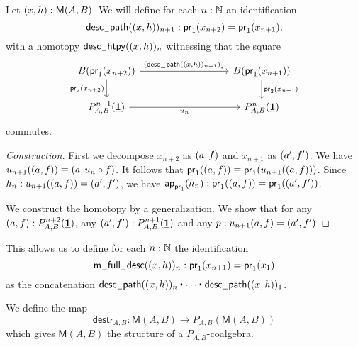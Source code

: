 \begin{defn}
Let ${\mathopen{}(x,h)\mathclose{}}:\mathsf{M}(A,B)$. 
We will define for each $n:\mathbb{N}$ an identification
\begin{equation*}
\mathsf{desc\mathord{\hspace{1pt}\underline{\hspace{1ex}}\hspace{1pt}} path}({\mathopen{}(x,h)\mathclose{}})_{n+1} : \mathsf{pr}_{1}(x_{n+2})=\mathsf{pr}_{1}(x_{n+1}),
\end{equation*} 
with a homotopy $\mathsf{desc\mathord{\hspace{1pt}\underline{\hspace{1ex}}\hspace{1pt}} htpy}({\mathopen{}(x,h)\mathclose{}})_n$ 
witnessing that the square
\begin{equation*}
\begin{tikzcd}[column sep=9em]
B(\proj 1(x_{n+2})) \arrow[r,"\transf{(\mathsf{desc\nameless path}(\pairr{x,h})_{n+1})}"] \arrow[d,swap,"\proj 2(x_{n+2})"] & B(\proj 1(x_{n+1})) \arrow[d,"\proj 2(x_{n+1})"] \\
P_{A,B}^{n+1}(\unit) \arrow[r,swap,"u_n"] & P_{A,B}^n(\unit)
\end{tikzcd}
\end{equation*}
commutes.
\end{defn}

\begin{proof}[Construction]
First we decompose $x_{n+2}$ as ${\mathopen{}(a,f)\mathclose{}}$ and $x_{n+1}$ as ${\mathopen{}(a',f')\mathclose{}}$. 
We have $u_{n+1}({\mathopen{}(a,f)\mathclose{}})\equiv {\mathopen{}(a,u_n\circ f)\mathclose{}}$. 
It follows that $\mathsf{pr}_{1}({\mathopen{}(a,f)\mathclose{}})\equiv \mathsf{pr}_{1}(u_{n+1}({\mathopen{}(a,f)\mathclose{}}))$.
Since $h_n:u_{n+1}({\mathopen{}(a,f)\mathclose{}})={\mathopen{}(a',f')\mathclose{}}$, we have
$\mathsf{ap}_{\mathsf{pr}_{1}}(h_n) : \mathsf{pr}_{1}({\mathopen{}(a,f)\mathclose{}})=\mathsf{pr}_{1}({\mathopen{}(a',f')\mathclose{}})$. 

We construct the homotopy by a generalization. 
We show that for any ${\mathopen{}(a,f)\mathclose{}}:P_{A,B}^{n+2}(\underline{\mathbf{1}})$,
any ${\mathopen{}(a',f')\mathclose{}}:P_{A,B}^{n+1}(\underline{\mathbf{1}})$ and any $p:u_{n+1}(a,f)={\mathopen{}(a',f')\mathclose{}}$
\end{proof}

\begin{defn}
This allows us to define for each $n:\mathbb{N}$ the identification
\begin{equation*}
\mathsf{m\mathord{\hspace{1pt}\underline{\hspace{1ex}}\hspace{1pt}} full\mathord{\hspace{1pt}\underline{\hspace{1ex}}\hspace{1pt}} desc}({\mathopen{}(x,h)\mathclose{}})_n : \mathsf{pr}_{1}(x_{n+1})=\mathsf{pr}_{1}(x_{1})
\end{equation*} 
as the concatenation $\ct{\mathsf{desc\nameless path}(\pairr{x,h})_{n}}{\cdots}{\mathsf{desc\nameless path}(\pairr{x,h})_1}$.
\end{defn}

\begin{defn}
We define the map
\begin{equation*}
\mathsf{destr}_{A,B} : \mathsf{M}(A,B)\to P_{A,B}(\mathsf{M}(A,B))
\end{equation*}
which gives $\mathsf{M}(A,B)$ the structure of a $P_{A,B}$-coalgebra.
\end{defn}


